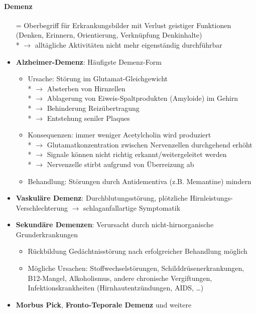 \paragraph{Demenz}
\begin{itemize}
  \item[=] Oberbegriff für Erkrankungsbilder mit Verlust geistiger Funktionen (Denken, Erinnern, Orientierung, Verknüpfung Denkinhalte) \\* \( \to \) alltägliche Aktivitäten nicht mehr eigenständig durchführbar
  \item \textbf{Alzheimer-Demenz}: Häufigste Demenz-Form
  \begin{itemize}
    \item Ursache: Störung im Glutamat-Gleichgewicht \\* \( \to \) Absterben von Hirnzellen \\* \( \to \) Ablagerung von Eiweis-Spaltprodukten (Amyloide) im Gehirn \\* \( \to \) Behinderung Reizübertragung \\* \( \to \) Entstehung seniler Plaques
    \item Konsequenzen: immer weniger Acetylcholin wird produziert \\* \( \to \) Glutamatkonzentration zwischen Nervenzellen durchgehend erhöht \\* \( \to \) Signale können nicht richtig erkannt/weitergeleitet werden \\* \( \to \) Nervenzelle stirbt aufgrund von Überreizung ab
    \item Behandlung: Störungen durch Antidementiva (z.B. Memantine) mindern
  \end{itemize}
  \item \textbf{Vaskuläre Demenz}: Durchblutungsstörung, plötzliche Hirnleistungs-Verschlechterung \( \to \) schlaganfallartige Symptomatik
  \item \textbf{Sekundäre Demenzen}: Verursacht durch nicht-hirnorganische Grunderkrankungen
  \begin{itemize}
    \item Rückbildung Gedächtnisstörung nach erfolgreicher Behandlung möglich
    \item Mögliche Ursachen: Stoffwechselstörungen, Schilddrüsenerkrankungen, B12-Mangel, Alkoholismus, andere chronische Vergiftungen, Infektionskrankheiten (Hirnhautentzündungen, AIDS, \dots)
  \end{itemize}
  \item \textbf{Morbus Pick}, \textbf{Fronto-Teporale Demenz} und weitere
\end{itemize}

